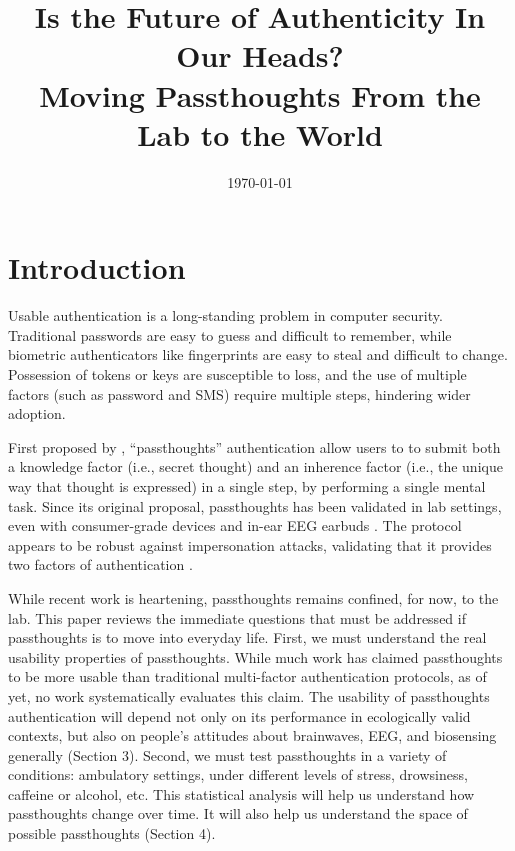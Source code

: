 \documentclass[sigconf]{acmart}
\date{\today}
\title{Is the Future of Authenticity In Our Heads?\\\medskip
\large Moving Passthoughts From the Lab to the World}
\begin{document}
\maketitle

\section{Introduction}
\label{sec:org11c166e}

Usable authentication is a long-standing problem in computer security.
Traditional passwords are easy to guess and difficult to remember,
while biometric authenticators like fingerprints are easy to steal and difficult to change.
Possession of tokens or keys are susceptible to loss, 
and the use of multiple factors (such as password and SMS) require multiple steps, hindering wider adoption.

First proposed by \cite{Thorpe2005}, ``passthoughts'' authentication allow users to 
to submit both a knowledge factor (i.e., secret thought) and an inherence factor (i.e., the unique way that thought is expressed)
in a single step, by performing a single mental task.
Since its original proposal, passthoughts has been validated in lab settings, even with 
consumer-grade devices \cite{Chuang2013b} and in-ear EEG earbuds \cite{curranpassthoughts}.
The protocol appears to be robust against impersonation attacks, validating that it provides two factors of authentication \cite{Johnson2014}.

While recent work is heartening, passthoughts remains confined, for now, to the lab.
This paper reviews the immediate questions that must be addressed if passthoughts is to move into everyday life.
First, we must understand the real usability properties of passthoughts.
While much work has claimed passthoughts to be more usable than traditional multi-factor authentication protocols,
as of yet, no work systematically evaluates this claim.
The usability of passthoughts authentication will depend not only on its performance in ecologically valid contexts,
but also on people's attitudes about brainwaves, EEG, and biosensing generally (Section 3).
Second, we must test passthoughts in a variety of conditions: ambulatory settings, under different levels of stress, drowsiness, caffeine or alcohol, etc.
This statistical analysis will help us understand how passthoughts change over time.
It will also help us understand the space of possible passthoughts (Section 4).
\end{document}
